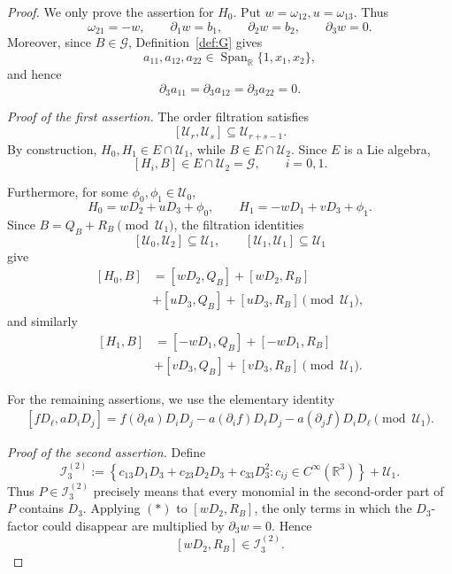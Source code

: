 \documentclass[11pt,a4paper]{article}
\numberwithin{equation}{section}
\theoremstyle{journalplain}
\theoremstyle{journaldef}
\begin{document}
\begin{tcolorbox}[
  title={Proof of Theorem~\ref{Thm3.1}},
  breakable
]
\begin{proof}
We only prove the assertion for $H_0$. Put
\(
w=\omega_{12},
u=\omega_{13}.
\)
Thus
\[
\omega_{21}=-w,
\qquad
\partial_1w=b_1,\qquad
\partial_2w=b_2,\qquad
\partial_3w=0.
\]
Moreover, since \(B\in\mathcal G\), Definition~\ref{def:G} gives
\[
a_{11},a_{12},a_{22}
\in\operatorname{Span}_{\mathbb R}\{1,x_1,x_2\},
\]
and hence
\[
\partial_3a_{11}
=\partial_3a_{12}
=\partial_3a_{22}=0.
\]

\medskip
\noindent\emph{Proof of the first assertion.}
The order filtration satisfies
\[
[\mathcal U_r,\mathcal U_s]
\subseteq\mathcal U_{r+s-1}.
\]
By construction, \(H_0,H_1\in E\cap\mathcal U_1\), while
\(B\in E\cap\mathcal U_2\). Since \(E\) is a Lie algebra,
\[
[H_i,B]\in E\cap\mathcal U_2=\mathcal G,
\qquad i=0,1.
\]

Furthermore, for some \(\phi_0,\phi_1\in\mathcal U_0\),
\[
H_0=wD_2+uD_3+\phi_0,
\qquad
H_1=-wD_1+vD_3+\phi_1.
\]
Since \(B=Q_B+R_B\pmod{\mathcal U_1}\), the filtration identities
\[
[\mathcal U_0,\mathcal U_2]\subseteq\mathcal U_1,
\qquad
[\mathcal U_1,\mathcal U_1]\subseteq\mathcal U_1
\]
give
\[
\begin{aligned}
[H_0,B]
&=
[wD_2,Q_B]+[wD_2,R_B]\\
&+[uD_3,Q_B]+[uD_3,R_B]
\pmod{\mathcal U_1},
\end{aligned}
\]
and similarly
\[
\begin{aligned}
[H_1,B]
&=
[-wD_1,Q_B]+[-wD_1,R_B]\\
&+[vD_3,Q_B]+[vD_3,R_B]
\pmod{\mathcal U_1}.
\end{aligned}
\]

\medskip
For the remaining assertions, we use the elementary identity
\begin{equation}\tag{*}
\begin{aligned}
[fD_\ell,aD_iD_j]
=
f(\partial_\ell a)D_iD_j
-a(\partial_i f)D_\ell D_j
-a(\partial_j f)D_iD_\ell
\pmod{\mathcal U_1}.
\end{aligned}
\end{equation}

\medskip
\noindent\emph{Proof of the second assertion.}
Define
\[
\mathcal I_3^{(2)}
:=
\left\{
c_{13}D_1D_3+c_{23}D_2D_3+c_{33}D_3^2:
c_{ij}\in C^\infty(\mathbb R^3)
\right\}
+\mathcal U_1.
\]
Thus \(P\in\mathcal I_3^{(2)}\) precisely means that every monomial
in the second-order part of \(P\) contains \(D_3\). Applying \((*)\)
to \([wD_2,R_B]\), the only terms in which the \(D_3\)-factor could
disappear are multiplied by \(\partial_3w=0\). Hence
\[
[wD_2,R_B]\in\mathcal I_3^{(2)}.
\]


\end{proof}
\end{tcolorbox}
\end{document}
